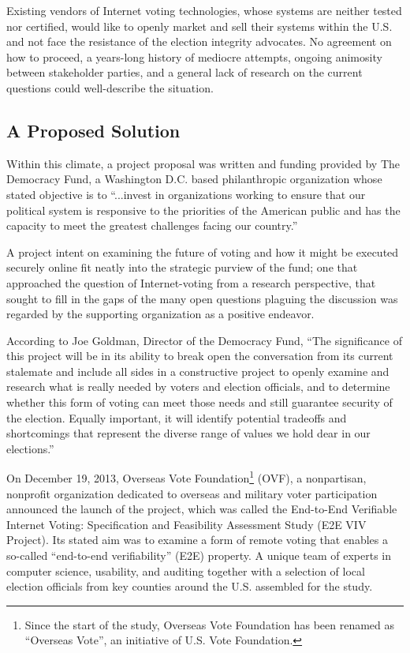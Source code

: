 Existing vendors of Internet voting technologies, whose systems are
neither tested nor certified, would like to openly market and sell
their systems within the U.S. and not face the resistance of the
election integrity advocates. No agreement on how to proceed, a
years-long history of mediocre attempts, ongoing animosity between
stakeholder parties, and a general lack of research on the current
questions could well-describe the situation.

\subsection{A Proposed Solution}

Within this climate, a project proposal was written and funding
provided by The Democracy Fund, a Washington D.C. based philanthropic
organization whose stated objective is to “...invest in organizations
working to ensure that our political system is responsive to the
priorities of the American public and has the capacity to meet the
greatest challenges facing our country.” 

A project intent on examining the future of voting and how it might be
executed securely online fit neatly into the strategic purview of the
fund; one that approached the question of Internet-voting from a
research perspective, that sought to fill in the gaps of the many open
questions plaguing the discussion was regarded by the supporting
organization as a positive endeavor. 

According to Joe Goldman, Director of the Democracy Fund, “The
significance of this project will be in its ability to break open the
conversation from its current stalemate and include all sides in a
constructive project to openly examine and research what is really
needed by voters and election officials, and to determine whether this
form of voting can meet those needs and still guarantee security of
the election. Equally important, it will identify potential tradeoffs
and shortcomings that represent the diverse range of values we hold
dear in our elections.”

On December 19, 2013, Overseas Vote Foundation\footnote{Since the
  start of the study, Overseas Vote Foundation has been renamed as
  “Overseas Vote”, an initiative of U.S. Vote Foundation.} (OVF), a
nonpartisan, nonprofit organization dedicated to overseas and military
voter participation announced the launch of the project, which was
called the End-to-End Verifiable Internet Voting: Specification and
Feasibility Assessment Study (E2E VIV Project). Its stated aim was to
examine a form of remote voting that enables a so-called “end-to-end
verifiability” (E2E) property. A unique team of experts in computer
science, usability, and auditing together with a selection of local
election officials from key counties around the U.S. assembled for the
study.

